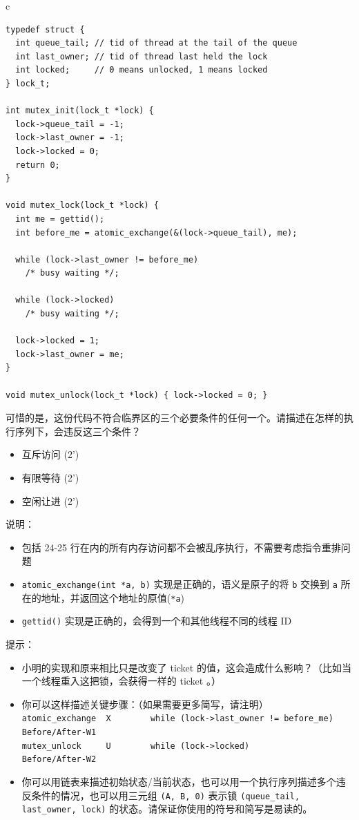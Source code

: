 \documentclass[a4paper,12pt]{article}
\newcommand{\score}[1]{(#1')}
\begin{document}
\begin{table}[htb]
  \centering
  \begin{tabular}{c}
    \begin{lstlisting}
typedef struct {
  int queue_tail; // tid of thread at the tail of the queue
  int last_owner; // tid of thread last held the lock
  int locked;     // 0 means unlocked, 1 means locked
} lock_t;

int mutex_init(lock_t *lock) {
  lock->queue_tail = -1;
  lock->last_owner = -1;
  lock->locked = 0;
  return 0;
}

void mutex_lock(lock_t *lock) {
  int me = gettid();
  int before_me = atomic_exchange(&(lock->queue_tail), me);

  while (lock->last_owner != before_me)
    /* busy waiting */;

  while (lock->locked)
    /* busy waiting */;

  lock->locked = 1;
  lock->last_owner = me;
}

void mutex_unlock(lock_t *lock) { lock->locked = 0; }
    \end{lstlisting}
  \end{tabular}
\end{table}

可惜的是，这份代码不符合临界区的三个必要条件的任何一个。请描述在怎样的执行序列下，会违反这三个条件？

\begin{itemize}
  \item 互斥访问 \score{2}
  \item 有限等待 \score{2}
  \item 空闲让进 \score{2}
\end{itemize}

说明：

\begin{itemize}
  \item 包括 24-25 行在内的所有内存访问都不会被乱序执行，不需要考虑指令重排问题
  \item \verb|atomic_exchange(int *a, b)| 实现是正确的，语义是原子的将 \verb|b| 交换到 \verb|a| 所在的地址，并返回这个地址的原值(\verb|*a|)
  \item \verb|gettid()| 实现是正确的，会得到一个和其他线程不同的线程 ID
\end{itemize}

提示：

\begin{itemize}
  \item 小明的实现和原来相比只是改变了 ticket 的值，这会造成什么影响？（比如当一个线程重入这把锁，会获得一样的 ticket 。）
  \item 你可以这样描述关键步骤：（如果需要更多简写，请注明） \\
  \small\verb|atomic_exchange  X		while (lock->last_owner != before_me) Before/After-W1| \\
  \small\verb|mutex_unlock     U		while (lock->locked) 				 Before/After-W2|
  \item 你可以用链表来描述初始状态/当前状态，也可以用一个执行序列描述多个违反条件的情况，也可以用三元组 \verb|(A, B, 0)| 表示锁 \verb|(queue_tail, last_owner, lock)| 的状态。请保证你使用的符号和简写是易读的。
\end{itemize}

\label{LastPage}
\end{document}
